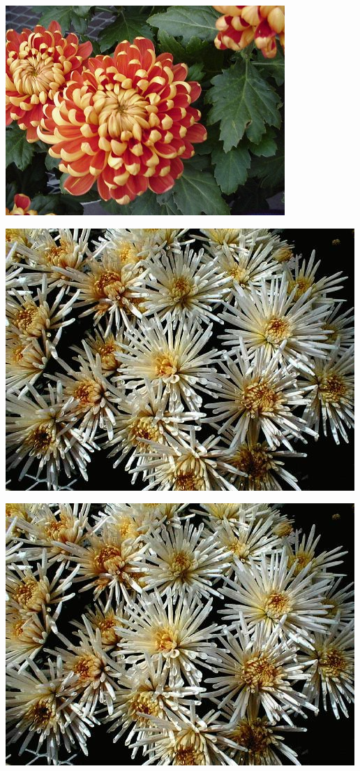 \documentclass{article}
\begin{document}
\begin{center}
\includegraphics[width=0.9\textheight, angle=90]{../Chrysanthemum_PianoCopper.jpg}
\end{center}
\newpage

\begin{center}
\includegraphics[width=0.9\textheight, angle=90]{../Chrysanthemum_Quill.jpg}
\end{center}
\newpage

\begin{center}
\includegraphics[width=0.9\textheight, angle=90]{../Chrysanthemum_Quill2.jpg}
\end{center}
\newpage
\end{document}

